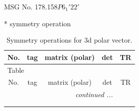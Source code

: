 \documentclass[fleqn,8pt]{jsarticle}
\begin{document}
\setcounter{MaxMatrixCols}{32}

\renewcommand{\tablename}{Table~}
\renewcommand{\figurename}{Figure~}
\begin{center}
\LARGE
MSG No. 178.158\quad$P6_{1}'22'$
\end{center}
* symmetry operation
\renewcommand{\arraystretch}{1.3}
\begin{longtable}{ccccc}
\caption{Symmetry operations for 3d polar vector.}
 \\
 \hline \hline
No. & tag & matrix (polar) & det & TR \\ \hline \endfirsthead

\multicolumn{4}{l}{\tablename\ \thetable{}} \\
 \hline \hline
No. & tag & matrix (polar) & det & TR \\ \hline \endhead

 \hline \hline
\multicolumn{4}{r}{\footnotesize\it continued ...} \\ \endfoot

 \hline \hline
\multicolumn{4}{r}{} \\ \endlastfoot


\end{longtable}
\end{document}
